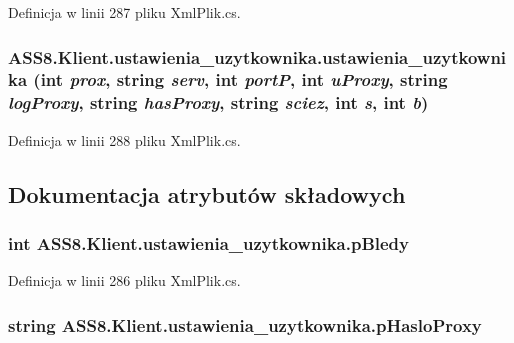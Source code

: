 Definicja w linii 287 pliku XmlPlik.cs.\hypertarget{a00029_e9279b1a6008a696e2d0d85ec19d9a5a}{
\subsubsection[{ustawienia\_\-uzytkownika}]{\setlength{\rightskip}{0pt plus 5cm}ASS8.Klient.ustawienia\_\-uzytkownika.ustawienia\_\-uzytkownika (int {\em prox}, \/  string {\em serv}, \/  int {\em portP}, \/  int {\em uProxy}, \/  string {\em logProxy}, \/  string {\em hasProxy}, \/  string {\em sciez}, \/  int {\em s}, \/  int {\em b})}}
\label{d5/d16/a00029_e9279b1a6008a696e2d0d85ec19d9a5a}




Definicja w linii 288 pliku XmlPlik.cs.

\subsection{Dokumentacja atrybutów składowych}
\hypertarget{a00029_0cfa9fa0a67f8cd106a548e87783e6c2}{
\subsubsection[{pBledy}]{\setlength{\rightskip}{0pt plus 5cm}int {\bf ASS8.Klient.ustawienia\_\-uzytkownika.pBledy}}}
\label{d5/d16/a00029_0cfa9fa0a67f8cd106a548e87783e6c2}




Definicja w linii 286 pliku XmlPlik.cs.\hypertarget{a00029_dd4d3aa0c6b2dbba8b60dcb868443bf2}{
\subsubsection[{pHasloProxy}]{\setlength{\rightskip}{0pt plus 5cm}string {\bf ASS8.Klient.ustawienia\_\-uzytkownika.pHasloProxy}}}
\label{d5/d16/a00029_dd4d3aa0c6b2dbba8b60dcb868443bf2}




